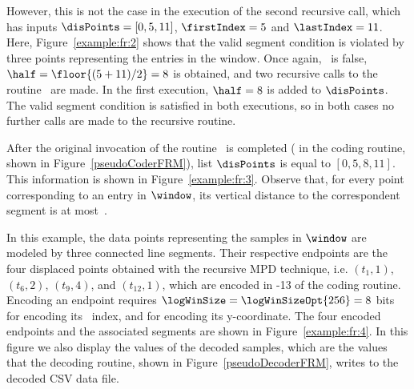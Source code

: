 \clearpage




However, this is not the case in the execution of the second recursive call, which has inputs $\disPoints=[0, 5, 11]$, $\firstIndex = 5$ and $\lastIndex = 11$. Here, Figure~\ref{example:fr:2} shows that the valid segment condition is violated by three points representing the entries in the window. Once again, \validSegment\ is false, $\half=\floor{(5 + 11) / 2}=8$ is obtained, and two recursive calls to the routine \getDisplacedPointsMethod\ are made. In the first execution, $\half=8$ is added to $\disPoints$. The valid segment condition is satisfied in both executions, so in both cases no further calls are made to the recursive routine. 


After the original invocation of the routine \getDisplacedPointsMethod\ is completed ( in the coding routine, shown in Figure~\ref{pseudoCoderFRM}), list $\disPoints$ is equal to $[0, 5, 8, 11]$. This information is shown in Figure~\ref{example:fr:3}. Observe that, for every point corresponding to an entry in $\window$, its vertical distance to the correspondent segment is at most~\maxerror.


\vspace{+5pt}


\clearpage


In this example, the data points representing the samples in $\window$ are modeled by three connected line segments. Their respective endpoints are the four displaced points obtained with the recursive MPD technique, i.e. $(t_1, 1)$, $(t_6, 2)$, $(t_9, 4)$, and $(t_{12}, 1)$, which are encoded in -13 of the coding routine. Encoding an endpoint requires $\logWinSize = \logWinSizeOpt{256}=8$ bits for encoding its \window\ index, and \tobitexp for encoding its y-coordinate. The four encoded endpoints and the associated segments are shown in Figure~\ref{example:fr:4}. In this figure we also display the values of the decoded samples, which are the values that the decoding routine, shown in Figure~\ref{pseudoDecoderFRM}, writes to the decoded CSV data file. 


\vspace{+5pt}


\clearpage

